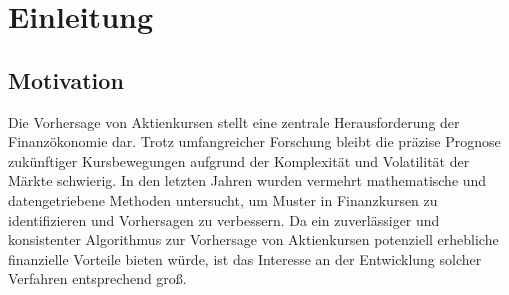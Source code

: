 
\chapter{Einleitung}\label{chap:einleitung}
\section{Motivation}\label{sec:motivation}
Die Vorhersage von Aktienkursen stellt eine zentrale Herausforderung der Finanzökonomie dar. Trotz umfangreicher Forschung bleibt die präzise Prognose zukünftiger Kursbewegungen aufgrund der Komplexität und Volatilität der Märkte schwierig. In den letzten Jahren wurden vermehrt mathematische und datengetriebene Methoden untersucht, um Muster in Finanzkursen zu identifizieren und Vorhersagen zu verbessern. Da ein zuverlässiger und konsistenter Algorithmus zur Vorhersage von Aktienkursen potenziell erhebliche finanzielle Vorteile bieten würde, ist das Interesse an der Entwicklung solcher Verfahren entsprechend groß.
